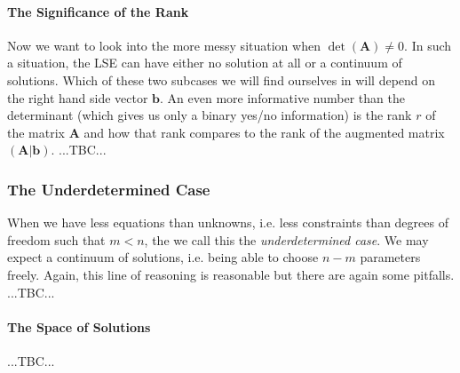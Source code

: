 \paragraph{The Significance of the Rank}
Now we want to look into the more messy situation when $\det(\mathbf{A}) \neq 0$. In such a situation, the LSE can have either no solution at all or a continuum of solutions. Which of these two subcases we will find ourselves in will depend on the right hand side vector $\mathbf{b}$. An even more informative number than the determinant (which gives us only a binary yes/no information) is the rank $r$ of the matrix $\mathbf{A}$ and how that rank compares to the rank of the augmented matrix $(\mathbf{A|b})$. ...TBC...








\subsubsection{The Underdetermined Case}
When we have less equations than unknowns, i.e. less constraints than degrees of freedom such that $m < n$, the we call this the \emph{underdetermined case}. We may expect a continuum of solutions, i.e. being able to choose $n-m$ parameters freely. Again, this line of reasoning is reasonable but there are again some pitfalls. ...TBC...

\paragraph{The Space of Solutions} ...TBC...

